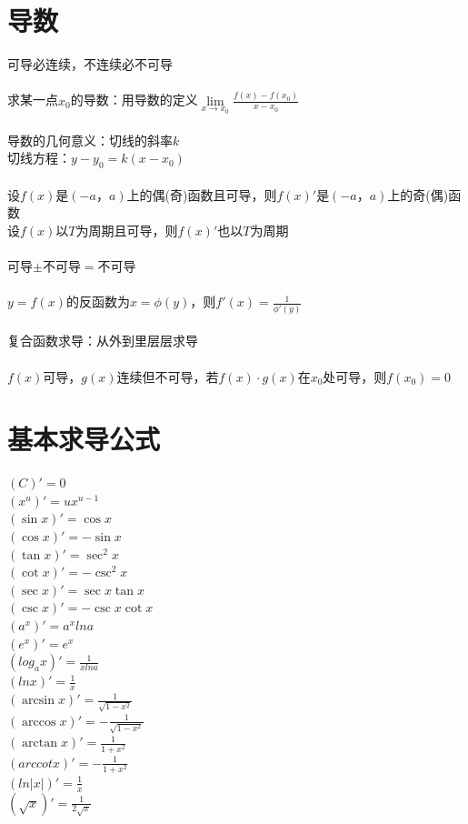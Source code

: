 \documentclass{article}
\begin{document}
\begin{flushleft}
	\LARGE
	
	\section{导数}
	
	可导必连续，不连续必不可导\\
	~\\
	求某一点$x_0$的导数：用导数的定义$\lim\limits_{x\to x_0} \frac{f(x)-f(x_0
		)}{x-x_0}$\\
	~\\
	导数的几何意义：切线的斜率$k$\\
	切线方程：$y-y_0=k(x-x_0)$\\
	~\\
	设$f(x)$是$(-a，a)$上的偶(奇)函数且可导，则$f(x)'$是$(-a，a)$上的奇(偶)函数\\
	设$f(x)$以$T$为周期且可导，则$f(x)'$也以$T$为周期\\
	~\\
	可导$\pm$不可导$=$不可导\\
	~\\
	$y=f(x)$的反函数为$x=\phi(y)$，则$f'(x)=\frac{1}{\phi'(y)}$\\
	~\\
	复合函数求导：从外到里层层求导\\
	~\\
	$f(x)$可导，$g(x)$连续但不可导，若$f(x)\cdot g(x)$在$x_0$处可导，则$f(x_0)=0$\\
	
	\section{基本求导公式}
	
	$(C)'=0$\\
	$(x^u)'=ux^{u-1}$\\
	$(\sin x)'=\cos x$\\
	$(\cos x)'=-\sin x$\\
	$(\tan x)'=\sec^2 x$\\
	$(\cot x)'=-\csc^2 x$\\
	$(\sec x)'=\sec x\tan x$\\
	$(\csc x)'=-\csc x\cot x$\\
	$(a^x)'=a^xlna$\\
	$(e^x)'=e^x$\\
	$(log_ax)'=\frac{1}{xlna}$\\
	$(lnx)'=\frac{1}{x}$\\
	$(\arcsin x)'=\frac{1}{\sqrt{1-x^2}}$\\
	$(\arccos x)'=-\frac{1}{\sqrt{1-x^2}}$\\
	$(\arctan x)'=\frac{1}{1+x^2}$\\
	$(arccot x)'=-\frac{1}{1+x^2}$\\
	$(ln|x|)'=\frac{1}{x}$\\
	$(\sqrt{x})'=\frac{1}{2\sqrt{x}}$\\
	

\end{flushleft}
\end{document}
